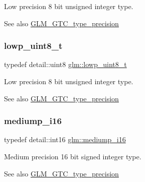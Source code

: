 Low precision 8 bit unsigned integer type. \begin{DoxySeeAlso}{See also}
\hyperlink{group__gtc__type__precision}{G\+L\+M\+\_\+\+G\+T\+C\+\_\+type\+\_\+precision} 
\end{DoxySeeAlso}
\mbox{\label{group__gtc__type__precision_ga0910ef24195d1b8b26e34d73148c0c45}} 
\subsubsection{\texorpdfstring{lowp\+\_\+uint8\+\_\+t}{lowp\_uint8\_t}}
{\footnotesize\ttfamily typedef detail\+::uint8 \hyperlink{group__gtc__type__precision_ga0910ef24195d1b8b26e34d73148c0c45}{glm\+::lowp\+\_\+uint8\+\_\+t}}

Low precision 8 bit unsigned integer type. \begin{DoxySeeAlso}{See also}
\hyperlink{group__gtc__type__precision}{G\+L\+M\+\_\+\+G\+T\+C\+\_\+type\+\_\+precision} 
\end{DoxySeeAlso}
\mbox{\label{group__gtc__type__precision_ga8454fc6a82c7bb787d0ac9663e08f63d}} 
\subsubsection{\texorpdfstring{mediump\+\_\+i16}{mediump\_i16}}
{\footnotesize\ttfamily typedef detail\+::int16 \hyperlink{group__gtc__type__precision_ga8454fc6a82c7bb787d0ac9663e08f63d}{glm\+::mediump\+\_\+i16}}

Medium precision 16 bit signed integer type. \begin{DoxySeeAlso}{See also}
\hyperlink{group__gtc__type__precision}{G\+L\+M\+\_\+\+G\+T\+C\+\_\+type\+\_\+precision} 
\end{DoxySeeAlso}
\mbox{\label{group__gtc__type__precision_ga5e00ec824eb55968a6b6496f294d8c07}} 
